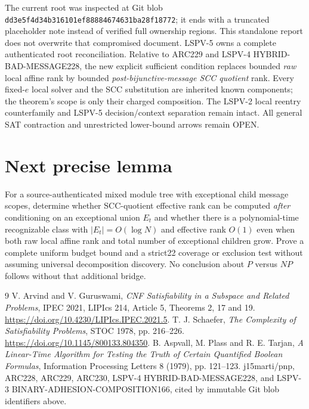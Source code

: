 \documentclass[11pt]{article}
\begin{document}
The current root  was inspected at Git blob \texttt{dd3e5f4d34b316101ef88884674631ba28f18772}; it ends with a truncated placeholder note instead of verified full ownership regions. This standalone report does not overwrite that compromised document. LSPV-5 owns a complete authenticated root reconciliation. Relative to ARC229 and LSPV-4 HYBRID-BAD-MESSAGE228, the new explicit sufficient condition replaces bounded \emph{raw} local affine rank by bounded \emph{post-bijunctive-message SCC quotient} rank. Every fixed-$e$ local solver and the SCC substitution are inherited known components; the theorem's scope is only their charged composition. The LSPV-2 local reentry counterfamily and LSPV-5 decision/context separation remain intact. All general SAT contraction and unrestricted lower-bound arrows remain OPEN.

\section{Next precise lemma}
For a source-authenticated mixed module tree with exceptional child message scopes, determine whether SCC-quotient effective rank can be computed \emph{after} conditioning on an exceptional union $E_t$ and whether there is a polynomial-time recognizable class with $|E_t|=O(\log N)$ and effective rank $O(1)$ even when both raw local affine rank and total number of exceptional children grow. Prove a complete uniform budget bound and a strict22 coverage or exclusion test without assuming universal decomposition discovery. No conclusion about $P$ versus $NP$ follows without that additional bridge.

\begin{thebibliography}{9}
 V. Arvind and V. Guruswami, \emph{CNF Satisfiability in a Subspace and Related Problems}, IPEC 2021, LIPIcs 214, Article 5, Theorems 2, 17 and 19. \url{https://doi.org/10.4230/LIPIcs.IPEC.2021.5}.
 T. J. Schaefer, \emph{The Complexity of Satisfiability Problems}, STOC 1978, pp. 216--226. \url{https://doi.org/10.1145/800133.804350}.
 B. Aspvall, M. Plass and R. E. Tarjan, \emph{A Linear-Time Algorithm for Testing the Truth of Certain Quantified Boolean Formulas}, Information Processing Letters 8 (1979), pp. 121--123.
 j15marti/pnp, ARC228, ARC229, ARC230, LSPV-4 HYBRID-BAD-MESSAGE228, and LSPV-3 BINARY-ADHESION-COMPOSITION166, cited by immutable Git blob identifiers above.
\end{thebibliography}
\end{document}
